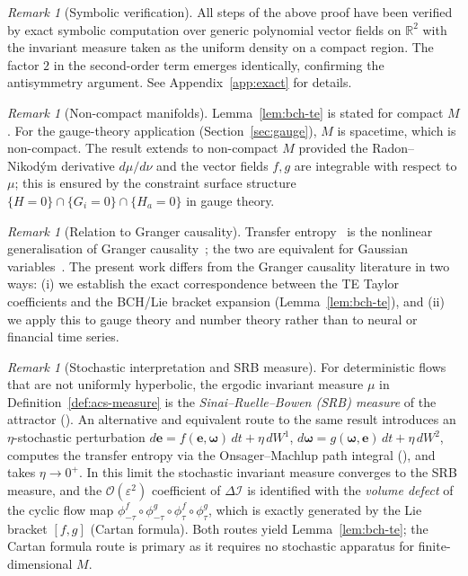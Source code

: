 \documentclass[12pt,a4paper]{article}
\theoremstyle{plain}
\theoremstyle{definition}
\theoremstyle{remark}
\newtheorem{remark}[theorem]{Remark}
\newcommand{\DI}{\Delta\mathcal{I}}
\begin{document}
\begin{remark}[Symbolic verification]
All steps of the above proof have been verified by exact symbolic computation
over generic polynomial vector fields on $\mathbb{R}^2$ with the invariant
measure taken as the uniform density on a compact region.  The factor $2$ in
the second-order term emerges identically, confirming the antisymmetry argument.
See Appendix~\ref{app:exact} for details.
\end{remark}

\begin{remark}[Non-compact manifolds]
Lemma~\ref{lem:bch-te} is stated for compact $M$.
For the gauge-theory application (Section~\ref{sec:gauge}), $M$ is spacetime,
which is non-compact.  The result extends to non-compact $M$ provided
the Radon--Nikod\'ym derivative $d\mu/d\nu$ and the vector fields $f,g$
are integrable with respect to $\mu$; this is ensured by the constraint
surface structure $\{H = 0\} \cap \{G_i = 0\} \cap \{H_a = 0\}$ in gauge theory.
\end{remark}

\begin{remark}[Relation to Granger causality]
Transfer entropy~\cite{Schreiber2000} is the nonlinear generalisation of
Granger causality~\cite{Granger1969}; the two are equivalent for Gaussian
variables~\cite{BarnettBarrettSeth2009}.  The present work differs from the
Granger causality literature in two ways: (i) we establish the exact
correspondence between the TE Taylor coefficients and the BCH/Lie bracket
expansion (Lemma~\ref{lem:bch-te}), and (ii) we apply this to gauge theory
and number theory rather than to neural or financial time series.
\end{remark}

\begin{remark}[Stochastic interpretation and SRB measure]
For deterministic flows that are not uniformly hyperbolic, the ergodic
invariant measure $\mu$ in Definition~\ref{def:acs-measure} is the
\emph{Sinai--Ruelle--Bowen (SRB) measure} of the attractor
(\cite{Sinai1972,Ruelle1976,Bowen1975}).  An alternative and equivalent
route to the same result introduces an $\eta$-stochastic perturbation
$d\mathbf{e} = f(\mathbf{e},\boldsymbol{\omega})\,dt + \eta\,dW^1$,
$d\boldsymbol{\omega} = g(\boldsymbol{\omega},\mathbf{e})\,dt + \eta\,dW^2$,
computes the transfer entropy via the Onsager--Machlup path integral
(\cite{OnsagerMachlup1953,FreidlinWentzell1984}), and takes $\eta\to 0^+$.
In this limit the stochastic invariant measure converges to the SRB measure,
and the $\mathcal{O}(\varepsilon^2)$ coefficient of $\DI$ is identified with
the \emph{volume defect} of the cyclic flow map
$\phi^f_{-\tau}\circ\phi^g_{-\tau}\circ\phi^f_\tau\circ\phi^g_\tau$,
which is exactly generated by the Lie bracket $[f,g]$ (Cartan formula).
Both routes yield Lemma~\ref{lem:bch-te}; the Cartan formula route
is primary as it requires no stochastic apparatus for finite-dimensional $M$.
\end{remark}
\end{document}
